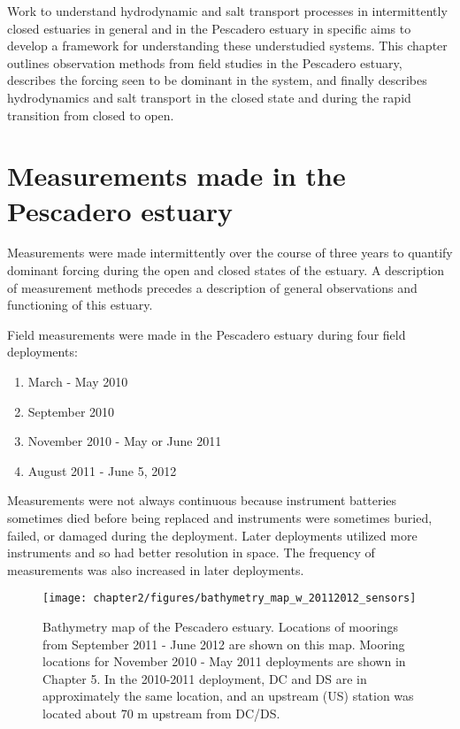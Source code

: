 Work to understand hydrodynamic and salt transport processes in intermittently closed estuaries in general and in the Pescadero estuary in specific aims to develop a framework for understanding these understudied systems. This chapter outlines observation methods from field studies in the Pescadero estuary, describes the forcing seen to be dominant in the system, and finally describes hydrodynamics and salt transport in the closed state and during the rapid transition from closed to open. 

\section{Measurements made in the Pescadero estuary} \label{measurementslabel}

Measurements were made intermittently over the course of three years to quantify dominant forcing during the open and closed states of the estuary. A description of measurement methods precedes a description of general observations and functioning of this estuary.

Field measurements were made in the Pescadero estuary during four field deployments:

\begin{enumerate}
	\item March - May 2010 
	\item September 2010 
	\item November 2010 - May or June 2011 
	\item August 2011 - June 5, 2012
\end{enumerate}

 Measurements were not always continuous because instrument batteries sometimes died before being replaced and instruments were sometimes buried, failed, or damaged during the deployment. Later deployments utilized more instruments and so had better resolution in space.  The frequency of measurements was also increased in later deployments. 

\begin{figure}[h]
\centering
	\texttt{[image: chapter2/figures/bathymetry\_map\_w\_20112012\_sensors]} \caption{Bathymetry map of the Pescadero estuary. Locations of moorings from September 2011 - June 2012 are shown on this map. Mooring locations for November 2010 - May 2011 deployments are shown in Chapter 5. In the 2010-2011 deployment, DC and DS are in approximately the same location, and an upstream (US) station was located about 70 m upstream from DC/DS.}\label{fig:BathyCh2}
\end{figure}


